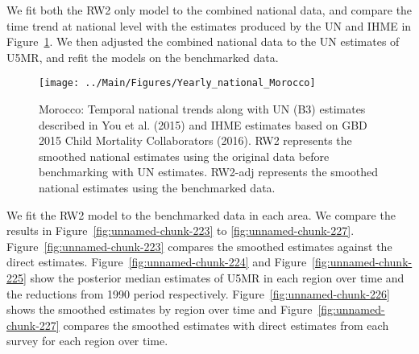 \documentclass[12pt]{article}\usepackage[]{graphicx}\usepackage[]{color}
\newenvironment{knitrout}{}{} %
\begin{document}
We fit both the RW2 only model to the combined national data, and compare the time trend at national level with the estimates produced by the UN and IHME in Figure~\ref{fig:unnamed-chunk-222}. We then adjusted the combined national data to the UN estimates of U5MR, and refit the models on the benchmarked data. 

\begin{knitrout}
\color{fgcolor}\begin{figure}[bht]

{\centering \texttt{[image: ../Main/Figures/Yearly\_national\_Morocco]} 

}

\caption[Morocco]{Morocco: Temporal national trends along with UN (B3) estimates described in You et al. (2015) and IHME estimates based on GBD 2015 Child Mortality Collaborators (2016). RW2 represents the smoothed national estimates using the original data before benchmarking with UN estimates. RW2-adj represents the smoothed national estimates using the benchmarked data.}\label{fig:unnamed-chunk-222}
\end{figure}


\end{knitrout}
 

We fit the RW2 model to the benchmarked data in each area. 
We compare the results in Figure~\ref{fig:unnamed-chunk-223} to \ref{fig:unnamed-chunk-227}.
Figure~\ref{fig:unnamed-chunk-223} compares the smoothed estimates against the direct estimates. Figure~\ref{fig:unnamed-chunk-224} and Figure~\ref{fig:unnamed-chunk-225} show the posterior median estimates of U5MR in each region over time and the reductions from 1990 period respectively.
Figure~\ref{fig:unnamed-chunk-226} shows the smoothed estimates by region over time and Figure~\ref{fig:unnamed-chunk-227} compares the smoothed estimates with direct estimates from each survey for each region over time.




\end{document}
